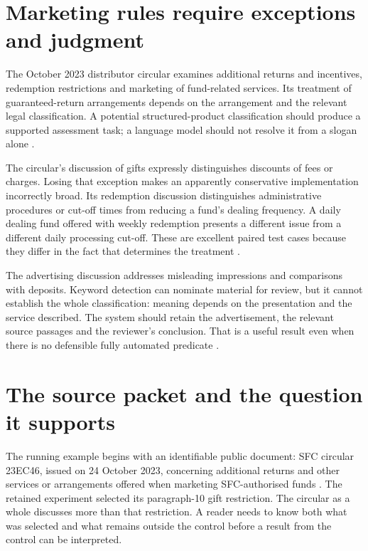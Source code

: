 \documentclass[12pt,a4paper,oneside,openany]{book}
\begin{document}
\section{Marketing rules require exceptions and judgment}
\label{merge:P-01-problem:04}


The October 2023 distributor circular examines additional returns and incentives,
redemption restrictions and marketing of fund-related services. Its treatment of
guaranteed-return arrangements depends on the arrangement and the relevant legal
classification. A potential structured-product classification should produce a
supported assessment task; a language model should not resolve it from a slogan
alone \citep[paras.~5--11]{sfcmarketing}.

The circular's discussion of gifts expressly distinguishes discounts of fees or
charges. Losing that exception makes an apparently conservative implementation
incorrectly broad. Its redemption discussion distinguishes administrative
procedures or cut-off times from reducing a fund's dealing frequency. A daily
dealing fund offered with weekly redemption presents a different issue from a
different daily processing cut-off. These are excellent paired test cases because
they differ in the fact that determines the treatment
\citep[paras.~9--14]{sfcmarketing}.

The advertising discussion addresses misleading impressions and comparisons with
deposits. Keyword detection can nominate material for review, but it cannot
establish the whole classification: meaning depends on the presentation and the
service described. The system should retain the advertisement, the relevant
source passages and the reviewer's conclusion. That is a useful result even when
there is no defensible fully automated predicate
\citep[paras.~15--17]{sfcmarketing}.

\section{The source packet and the question it supports}
\label{merge:M02:00}

\label{sec:circular-packet}
The running example begins with an identifiable public document: SFC circular
23EC46, issued on 24 October 2023, concerning additional returns and other
services or arrangements offered when marketing SFC-authorised funds
\citep{sfcmarketing}. The retained experiment selected its paragraph-10 gift
restriction. The circular as a whole discusses more than that restriction. A
reader needs to know both what was selected and what remains outside the control
before a result from the control can be interpreted.
\end{document}
